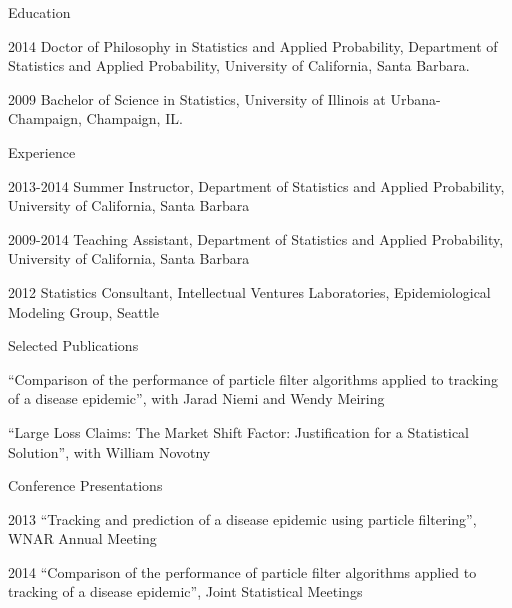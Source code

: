   \approvalpage
  \copyrightpage

  \begin{acknowledgements}


  \end{acknowledgements}
\ssp
  \begin{vitae}

    {\small
      \begin{vitaesection}{Education}
        \vspace{-0.1cm}
      \item [2014] Doctor of Philosophy in Statistics and Applied Probability, Department of
           Statistics and Applied Probability, University of California, Santa Barbara.
      \item [2009] Bachelor of Science in Statistics, University of Illinois at Urbana-Champaign, Champaign, IL.
      \end{vitaesection}

      \begin{vitaesection}{Experience}
        \vspace{-0.1cm}
      \item [2013-2014] Summer Instructor, Department of Statistics and Applied Probability, University of California, Santa Barbara
      \item [2009-2014] Teaching Assistant, Department of Statistics and Applied Probability, University of California, Santa Barbara
      \item [2012] Statistics Consultant, Intellectual Ventures Laboratories, Epidemiological Modeling Group, Seattle
      \end{vitaesection}

      \begin{vitaesection}{Selected Publications}
        \vspace{-0.1cm}
      \item ``Comparison of the performance of particle filter algorithms applied to tracking of a disease epidemic'', with Jarad Niemi and Wendy Meiring
      \item ``Large Loss Claims: The Market Shift Factor: Justification for a Statistical Solution'', with William Novotny
        \vspace{0.3cm}
      \end{vitaesection}

      \begin{vitaesection}{Conference Presentations}
        \vspace{-0.1cm}
      \item [2013] ``Tracking and prediction of a disease epidemic using particle filtering'', WNAR Annual Meeting
      \item [2014] ``Comparison of the performance of particle filter algorithms applied to tracking of a disease epidemic'', Joint Statistical Meetings
        \vspace{0.3cm}
      \end{vitaesection}

}
\end{vitae}
